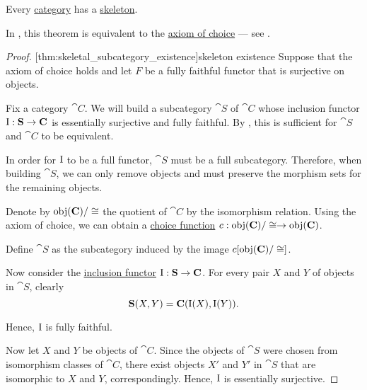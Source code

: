 \begin{theorem}\label{thm:category_skeleton_existence}
  Every \hyperref[def:category]{category} has a \hyperref[def:skeletal_category]{skeleton}.

  In \hyperref[def:zfc]{}, this theorem is equivalent to the \hyperref[def:zfc/choice]{axiom of choice} --- see .
\end{theorem}
\begin{proof}
  [thm:skeletal_subcategory_existence]{skeleton existence} Suppose that the axiom of choice holds and let \( F \) be a fully faithful functor that is surjective on objects.

  Fix a category \( \cat{C} \). We will build a subcategory \( \cat{S} \) of \( \cat{C} \) whose inclusion functor \( \operatorname{I}: \operatorname{\mathbf{S}} \to \operatorname{\mathbf{C}} \) is essentially surjective and fully faithful. By , this is sufficient for \( \cat{S} \) and \( \cat{C} \) to be equivalent.

  In order for \( \operatorname{I} \) to be a full functor, \( \cat{S} \) must be a full subcategory. Therefore, when building \( \cat{S} \), we can only remove objects and must preserve the morphism sets for the remaining objects.

  Denote by \( \operatorname{obj}(\operatorname{\mathbf{C}}) / \cong \) the quotient of \( \cat{C} \) by the isomorphism relation. Using the axiom of choice, we can obtain a \hyperref[def:choice_function]{choice function} \( c: \operatorname{obj}(\operatorname{\mathbf{C}}) / \cong \to \operatorname{obj}(\operatorname{\mathbf{C}}) \).

  Define \( \cat{S} \) as the subcategory induced by the image \( c[\operatorname{obj}(\operatorname{\mathbf{C}}) / \cong] \).

  Now consider the \hyperref[def:functor/inclusion]{inclusion functor} \( \operatorname{I}: \operatorname{\mathbf{S}} \to \operatorname{\mathbf{C}} \). For every pair \( X \) and \( Y \) of objects in \( \cat{S} \), clearly
  \begin{equation*}
    \operatorname{\mathbf{S}}(X, Y) = \operatorname{\mathbf{C}}(\operatorname{I}(X), \operatorname{I}(Y)).
  \end{equation*}

  Hence, \( \operatorname{I} \) is fully faithful.

  Now let \( X \) and \( Y \) be objects of \( \cat{C} \). Since the objects of \( \cat{S} \) were chosen from isomorphism classes of \( \cat{C} \), there exist objects \( X' \) and \( Y' \) in \( \cat{S} \) that are isomorphic to \( X \) and \( Y \), correspondingly. Hence, \( \operatorname{I} \) is essentially surjective.


\end{proof}
